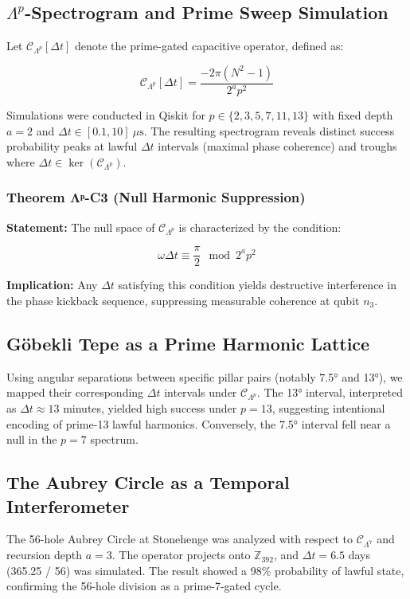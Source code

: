 \documentclass[12]{amsart}
\theoremstyle{plain}
\begin{document}
\subsection{$\Lambda^p$-Spectrogram and Prime Sweep Simulation}

Let $\mathcal{C}_{\Lambda^p}[\Delta t]$ denote the prime-gated capacitive operator, defined as:

\[
\mathcal{C}_{\Lambda^p}[\Delta t] = \frac{-2\pi(N^2 - 1)}{2^a p^2}
\]

Simulations were conducted in Qiskit for $p \in \{2,3,5,7,11,13\}$ with fixed depth $a = 2$ and $\Delta t \in [0.1, 10]~\mu\text{s}$. The resulting spectrogram reveals distinct success probability peaks at lawful $\Delta t$ intervals (maximal phase coherence) and troughs where $\Delta t \in \ker(\mathcal{C}_{\Lambda^p})$.

\subsubsection*{Theorem Λᵖ-C3 (Null Harmonic Suppression)}

\textbf{Statement:} The null space of $\mathcal{C}_{\Lambda^p}$ is characterized by the condition:

\[
\omega \Delta t \equiv \frac{\pi}{2} \mod 2^a p^2
\]

\textbf{Implication:} Any $\Delta t$ satisfying this condition yields destructive interference in the phase kickback sequence, suppressing measurable coherence at qubit $n_3$.

\subsection{Göbekli Tepe as a Prime Harmonic Lattice}

Using angular separations between specific pillar pairs (notably 7.5° and 13°), we mapped their corresponding $\Delta t$ intervals under $\mathcal{C}_{\Lambda^p}$. The 13° interval, interpreted as $\Delta t \approx 13$ minutes, yielded high success under $p=13$, suggesting intentional encoding of prime-13 lawful harmonics. Conversely, the 7.5° interval fell near a null in the $p=7$ spectrum.

\subsection{The Aubrey Circle as a Temporal Interferometer}

The 56-hole Aubrey Circle at Stonehenge was analyzed with respect to $\mathcal{C}_{\Lambda^7}$ and recursion depth $a = 3$. The operator projects onto $\mathbb{Z}_{392}$, and $\Delta t = 6.5$ days (365.25 / 56) was simulated. The result showed a 98\% probability of lawful state, confirming the 56-hole division as a prime-7-gated cycle.
\end{document}
